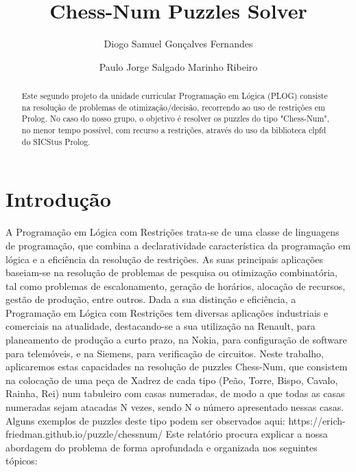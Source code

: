 \documentclass[runningheads]{llncs}
\begin{document}
%
\title{Chess-Num Puzzles Solver}
%
%
\author{Diogo Samuel Gonçalves Fernandes \and
Paulo Jorge Salgado Marinho Ribeiro}
%
%
%
\maketitle
\begin{abstract}
Este segundo projeto da unidade curricular Programação em Lógica (PLOG) consiste na resolução de problemas
de otimização/decisão, recorrendo ao uso de restrições em Prolog. No caso do nosso grupo, o objetivo é resolver
os puzzles do tipo "Chess-Num", no menor tempo possível, com recurso a restrições, através do uso da biblioteca clpfd do SICStus Prolog.

\end{abstract}

\section{Introdução}
A Programação em Lógica com Restrições trata-se de uma classe de linguagens de programação, que combina a declaratividade característica da programação em lógica
e a eficiência da resolução de restrições. As suas principais aplicações baseiam-se na resolução de problemas de pesquisa ou otimização combinatória, tal como problemas de escalonamento, geração de horários, alocação de recursos, gestão de produção, entre outros.
Dada a sua distinção e eficiência, a Programação em Lógica com Restrições tem diversas aplicações industriais e comerciais na atualidade, destacando-se a sua utilização na Renault, para planeamento de produção a curto prazo, na Nokia, para configuração de software para telemóveis, e na Siemens, para verificação de circuitos.
Neste trabalho, aplicaremos estas capacidades na resolução de puzzles Chess-Num, que consistem na colocação de uma peça de Xadrez de cada tipo (Peão, Torre, Bispo, Cavalo, Rainha, Rei) num tabuleiro com casas numeradas, de modo a que todas as casas numeradas sejam atacadas N vezes, sendo N o número apresentado nessas casas. 
Alguns exemplos de puzzles deste tipo podem ser observados aqui: https://erich-friedman.github.io/puzzle/chessnum/
Este relatório procura explicar a nossa abordagem do problema de forma aprofundada e organizada nos seguintes tópicos:
\end{document}
